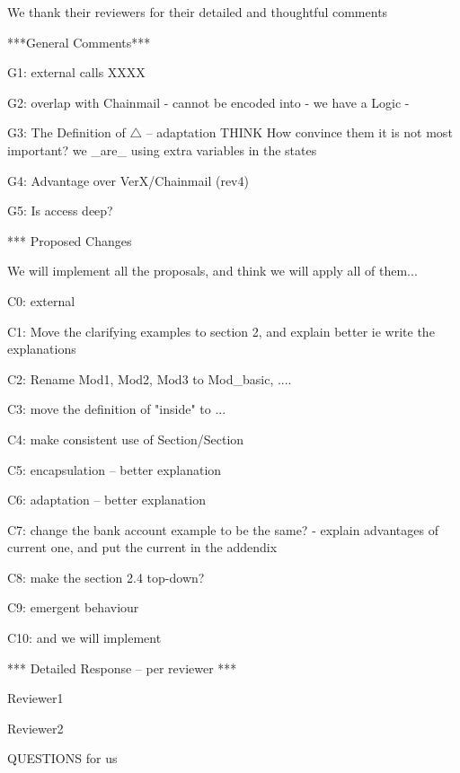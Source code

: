 We thank their reviewers for their detailed and thoughtful comments 


***General Comments***

G1: external calls
XXXX

G2:  overlap with Chainmail
- cannot be encoded into
- we have a Logic
- %

G3: The Definition of $\triangle$ -- adaptation
THINK
How convince them it is not most important?
we _are_ using extra variables in the states

G4: Advantage over VerX/Chainmail (rev4)

G5: Is access deep?


*** Proposed Changes

We will implement all the proposals, and think we will apply all of them...

C0: external

C1: Move the clarifying examples to section 2, and explain better
ie write the explanations

C2: Rename Mod1, Mod2, Mod3 to Mod_{basic}, ....

C3: move the definition of "inside" to ...

C4: make consistent use of Section/Section

C5: encapsulation -- better explanation

C6: adaptation -- better explanation

C7: change the bank account example to be the same?
- explain advantages of current one, and put the current in the addendix

C8: make the section 2.4 top-down?

C9: emergent behaviour 

C10: and we will implement
 


*** Detailed Response -- per reviewer ***

Reviewer1

Reviewer2


QUESTIONS for us